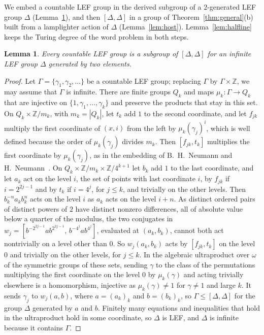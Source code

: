 \documentclass[11pt]{amsart}
\newtheorem{lemma}{Lemma}
\newcommand{\Z}{\mathbb Z}
\begin{document}
We embed a countable LEF group in the derived subgroup of a $2$-generated
LEF group $\Delta$ (Lemma~\ref{lem:nn}), and then $[\Delta,\Delta]$ in a
group of Theorem~\ref{thm:general}\textup{(b)} built from a lamplighter
action of $\Delta$ (Lemma~\ref{lem:host}). Lemma~\ref{lem:halfline} keeps
the Turing degree of the word problem in both steps.

\begin{lemma}\label{lem:nn}
Every countable LEF group is a subgroup of $[\Delta,\Delta]$ for an
infinite LEF group $\Delta$ generated by two elements.
\end{lemma}

\begin{proof}
Let $\Gamma=\{\gamma_1,\gamma_2,\dots\}$ be a countable LEF group;
replacing $\Gamma$ by $\Gamma\times\Z$, we may assume that $\Gamma$ is
infinite. There are finite groups $Q_k$ and maps $\mu_k\colon\Gamma\to Q_k$
that are injective on $\{1,\gamma_1,\dots,\gamma_k\}$ and preserve the
products that stay in this set. On $Q_k\times\Z/m_k$, with $m_k=|Q_k|$, let
$t_k$ add $1$ to the second coordinate, and let $f_{jk}$ multiply the first
coordinate of $(x,i)$ from the left by $\mu_k(\gamma_j)^i$, which is well
defined because the order of $\mu_k(\gamma_j)$ divides $m_k$. Then
$[f_{jk},t_k]$ multiplies the first coordinate by $\mu_k(\gamma_j)$, as in
the embedding of B.~H.~Neumann and H.~Neumann~\cite{NeumannNeumann}. On
$Q_k\times\Z/m_k\times\Z/4^{k+1}$ let $b_k$ add $1$ to the last
coordinate, and let $a_k$ act on the level $i$, the set of points with last
coordinate $i$, by $f_{jk}$ if $i=2^{2j-1}$ and by $t_k$ if $i=4^j$, for
$j\le k$, and trivially on the other levels. Then $b_k^{-n}a_kb_k^n$ acts
on the level $i$ as $a_k$ acts on the level $i+n$. As distinct ordered
pairs of distinct powers of $2$ have distinct nonzero differences, all of
absolute value below a quarter of the modulus, the two conjugates in
$w_j=[b^{-2^{2j-1}}ab^{2^{2j-1}},\,b^{-4^j}ab^{4^j}]$, evaluated at
$(a_k,b_k)$, cannot both act nontrivially on a level other than $0$. So
$w_j(a_k,b_k)$ acts by $[f_{jk},t_k]$ on the level $0$ and trivially on
the other levels, for $j\le k$. In the algebraic ultraproduct over $\omega$
of the symmetric groups of these sets, sending $\gamma$ to the class of the
permutations multiplying the first coordinate on the level $0$ by
$\mu_k(\gamma)$ and acting trivially elsewhere is a homomorphism,
injective as $\mu_k(\gamma)\ne1$ for $\gamma\ne1$ and large $k$. It sends
$\gamma_j$ to $w_j(a,b)$, where $a=(a_k)_k$ and $b=(b_k)_k$, so
$\Gamma\le[\Delta,\Delta]$ for the group $\Delta$ generated by $a$ and $b$.
Finitely many equations and inequalities that hold in the ultraproduct
hold in some coordinate, so $\Delta$ is LEF, and $\Delta$ is infinite
because it contains $\Gamma$.
\end{proof}
\end{document}
